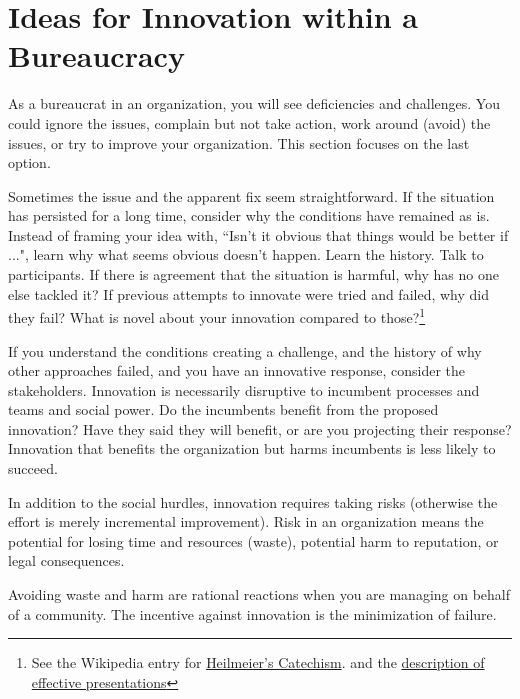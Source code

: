 \section{Ideas for Innovation within a Bureaucracy\label{sec:innovation}}

As a bureaucrat in an organization, you will see deficiencies and challenges. You could ignore the issues, complain but not take action, work around (avoid) the issues, or try to improve your organization. This section focuses on the last option.

Sometimes the issue and the apparent fix seem straightforward. If the situation has persisted for a long time, consider why the conditions have remained as is. 
Instead of framing your idea with, ``Isn't it obvious that things would be better if ...", learn why what seems obvious doesn't happen. 
Learn the history. Talk to participants. If there is agreement that the situation is harmful, why has no one else tackled it? If previous attempts to innovate were tried and failed, why did they fail? What is novel about your innovation compared to those?\footnote{See the Wikipedia entry for  \href{https://en.wikipedia.org/wiki/George_H._Heilmeier\%23Heilmeier's_Catechism}{Heilmeier's Catechism}.
and the \hyperref[sec:effective-presentations]{description of effective presentations}
\iftoggle{haspagenumbers}{ on page~\pageref{sec:effective-presentations}.}{.}
}

If you understand the conditions creating a challenge, and the history of why other approaches failed, and you have an innovative response, consider the stakeholders. 
Innovation is necessarily disruptive to incumbent processes and teams and social power. 
Do the incumbents benefit from the proposed innovation? Have they said they will benefit, or are you projecting their response? 
Innovation that benefits the organization but harms incumbents is less likely to succeed. 

In addition to the social hurdles, innovation requires taking risks (otherwise the effort is merely incremental improvement). Risk in an organization means the potential for losing time and resources (waste), potential harm to reputation, or legal consequences. 

Avoiding waste and harm are rational reactions when you are managing \iftoggle{glossarysubstitutionworks}{\glspl{shared resource}}{shared resources} on behalf 
of a community. The incentive against innovation is the minimization of failure.

